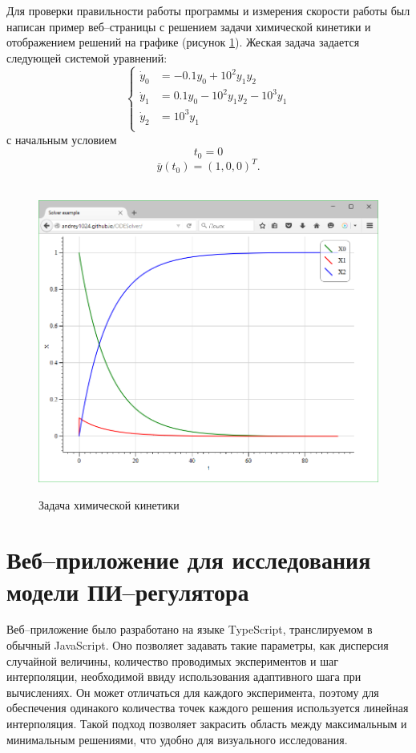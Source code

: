 \documentclass[oneside,final,14pt]{extreport}
\begin{document}
Для проверки правильности работы программы и измерения скорости работы был написан пример веб--страницы с решением задачи химической кинетики и отображением решений на графике (рисунок \ref{graph}). Жеская задача задается следующей системой уравнений:
\[
\left\{
\begin{aligned}
	\dot y_0 &= -0.1y_0+10^2y_1y_2\\ 
	\dot y_1 &= 0.1y_0-10^2y_1y_2-10^3y_1\\
	\dot y_2 &= 10^3y_1\\
\end{aligned}
\right.
\]
с начальным условием 
\[
t_0=0
\]
\[
\bar y(t_0)=(1,0,0)^T.
\]

\begin{figure}[h]
	\centering
\	\includegraphics[width=1\textwidth]{graph}
	\caption{Задача химической кинетики}
	\label{graph}
\end{figure}



\section{Веб--приложение для исследования модели ПИ--регулятора}
Веб--приложение было разработано на языке TypeScript, транслируемом в обычный JavaScript. Оно позволяет задавать такие параметры, как дисперсия случайной величины, количество проводимых экспериментов и шаг интерполяции, необходимой ввиду использования адаптивного шага при вычислениях. Он может отличаться для каждого эксперимента, поэтому для  обеспечения одинакого количества точек каждого решения используется линейная интерполяция.  Такой подход позволяет закрасить область между максимальным и минимальным решениями, что удобно для визуального исследования.
\end{document}
